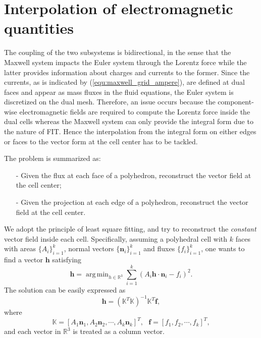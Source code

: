 \documentclass{report}
\DeclareMathOperator*{\argmin}{arg\,min}
\begin{document}
\section{Interpolation of electromagnetic quantities} \label{sec:interpolation}
The coupling of the two subsystems is bidirectional, in the sense that the Maxwell system impacts the Euler system through the Lorentz force while the latter provides information about charges and currents to the former. Since the currents, as is indicated by (\ref{equ:maxwell_grid_ampere}), are defined at dual faces and appear as mass fluxes in the fluid equations, the Euler system is discretized on the dual mesh. Therefore, an issue occurs because the component-wise electromagnetic fields are required to compute the Lorentz force inside the dual cells whereas the Maxwell system can only provide the integral form due to the nature of FIT. Hence the interpolation from the integral form on either edges or faces to the vector form at the cell center has to be tackled.

The problem is summarized as:
\begin{itemize}
    \item[-] Given the flux at each face of a polyhedron, reconstruct the vector field at the cell center;
    \item[-] Given the projection at each edge of a polyhedron, reconstruct the vector field at the cell center. 
\end{itemize}
We adopt the principle of least square fitting, and try to reconstruct the \emph{constant} vector field inside each cell. Specifically, assuming a polyhedral cell with $k$ faces with areas $\{A_i\}_{i=1}^k$, normal vectors $\{\mathbf{n}_i\}_{i=1}^k$ and fluxes $\{f_i\}_{i=1}^k$, one wants to find a vector $\mathbf{h}$ satisfying 
\begin{equation*}
    \mathbf{h} = \argmin_{h\in \mathbb{R}^3} \sum_{i=1}^k(A_i\mathbf{h} \cdot \mathbf{n}_i - f_i)^2.   
\end{equation*}
The solution can be easily expressed as
\begin{equation*}
    \mathbf{h} = (\mathbb{K}^T\mathbb{K})^{-1}\mathbb{K}^T\mathbf{f},
\end{equation*}
where
\begin{equation*}
    \mathbb{K} = [A_1\mathbf{n}_1, A_2\mathbf{n}_2, \cdots, A_k\mathbf{n}_k]^T,\ \ \ \mathbf{f} = [f_1, f_2, \cdots, f_k]^T,
\end{equation*}
and each vector in $\mathbb{R}^3$ is treated as a column vector.
\end{document}
